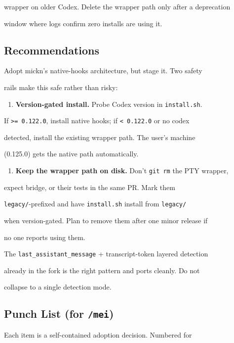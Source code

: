 \documentclass[twocolumn,10pt,letterpaper]{article}
\begin{document}
wrapper on older Codex. Delete the wrapper path only after a deprecation

window where logs confirm zero installs are using it.


\subsection{Recommendations}

Adopt mickn's native-hooks architecture, but stage it. Two safety

rails make this safe rather than risky:


\begin{enumerate}
\setlength{\itemsep}{0pt}
\setlength{\parskip}{0pt}
  \item \textbf{Version-gated install.} Probe Codex version in \texttt{install.sh}.
\end{enumerate}
   If \texttt{>= 0.122.0}, install native hooks; if \texttt{< 0.122.0} or no codex

   detected, install the existing wrapper path. The user's machine

   (0.125.0) gets the native path automatically.  

\begin{enumerate}
\setlength{\itemsep}{0pt}
\setlength{\parskip}{0pt}
  \item \textbf{Keep the wrapper path on disk.} Don't \texttt{git rm} the PTY wrapper,
\end{enumerate}
   expect bridge, or their tests in the same PR. Mark them

   \texttt{legacy/\allowbreak }-prefixed and have \texttt{install.sh} install from \texttt{legacy/\allowbreak }

   when version-gated. Plan to remove them after one minor release if

   no one reports using them.


The \texttt{last\_assistant\_message} + transcript-token layered detection

already in the fork is the right pattern and ports cleanly. Do not

collapse to a single detection mode.


\subsection{Punch List (for \texttt{/\allowbreak mei})}

Each item is a self-contained adoption decision. Numbered for
\end{document}
